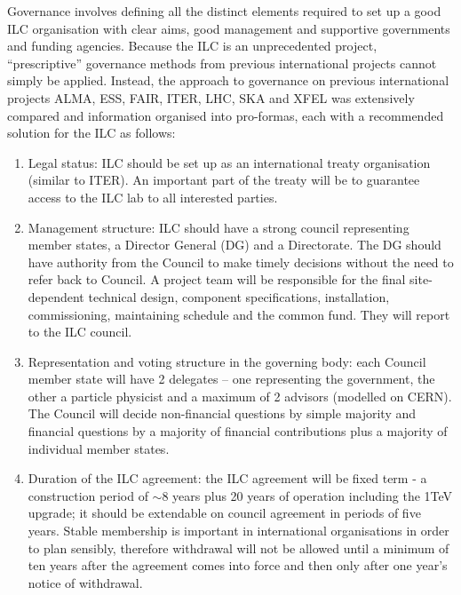 Governance involves defining all the distinct elements required to set up a good ILC organisation with clear aims, good management and supportive governments and funding agencies. Because the ILC is an unprecedented project, ``prescriptive'' governance methods from previous international projects cannot simply be applied. Instead, the approach to governance on previous international projects \textendash ALMA, ESS, FAIR, ITER, LHC, SKA and XFEL \textendash was extensively compared and information organised into pro-formas, each with a recommended solution for the ILC as follows: \cite{ILC:PIPReport}

\begin{enumerate}

\item Legal status: ILC should be set up as an international treaty organisation (similar to ITER). An important part of the treaty will be to guarantee access to the ILC lab to all interested parties.

\item Management structure: ILC should have a strong council representing member states, a Director General (DG) and a Directorate. The DG should have authority from the Council to make timely decisions without the need to refer back to Council. A project team will be responsible for the final site-dependent technical design, component specifications, installation, commissioning, maintaining schedule and the common fund. They will report to the ILC council.

\item Representation and voting structure in the governing body: each Council member state will have 2 delegates – one representing the government, the other a particle physicist \textendash and a maximum of 2 advisors (modelled on CERN). The Council will decide non-financial questions by simple majority and financial questions by a majority of financial contributions plus a majority of individual member states.

\item Duration of the ILC agreement: the ILC agreement will be fixed term - a construction period of $\sim$8 years plus 20 years of operation including the 1TeV upgrade; it should be extendable on council agreement in periods of five years. Stable membership is important in international organisations in order to plan sensibly, therefore withdrawal will not be allowed until a minimum of ten years after the agreement comes into force and then only after one year's notice of withdrawal.


\end{enumerate}

